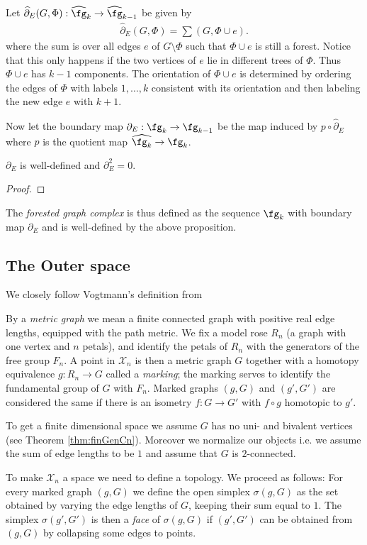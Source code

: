 \begin{definition}
	Let $\widehat{\partial}_E(G,\Phi): \widehat{\fg}_{k} \to \widehat{\fg}_{k-1}$ be given by
\begin{align*}
	\widehat{\partial}_{E}(G,\Phi) = \sum (G, \Phi \cup e)
.\end{align*}
where the sum is over all edges $e$ of $G \setminus \Phi$ such that $\Phi \cup e$ is still a forest.
Notice that this only happens if the two vertices of  $e$ lie in different trees of $\Phi$. Thus $\Phi \cup e$ has $k-1$ components.
The orientation of $\Phi \cup e$ is determined by ordering the edges of $\Phi$ with labels  $1,\ldots,k$ consistent with its orientation
and then labeling the new edge $e$ with  $k+1$.

Now let the boundary map $\partial_{E}: \fg_{k} \to \fg_{k-1}$ be the map induced by $p \circ \widehat{\partial}_{E}$ where $p$ is the quotient map $\widehat{\fg_{k}} \to \fg_{k}$.
\end{definition}

\begin{proposition}
	$\partial_{E}$ is well-defined and $\partial_{E}^2 = 0$.
\end{proposition}

\begin{proof}
	
\end{proof}

The \emph{forested graph complex} is thus defined as the sequence $\fg_{k}$ with boundary map $\partial_{E}$ and is well-defined by the above proposition.

\subsection{The Outer space}
We closely follow Vogtmann's definition from \cite[p. 2 ff.]{vogtmann16}
\begin{definition}
	By a \emph{metric graph} we mean a finite connected graph with positive real edge lengths, equipped with the path metric.
	We fix a model rose $R_{n}$ (a graph with one vertex and $n$ petals), and identify the petals of $R_{n}$ with the generators
	of the free group $F_{n}$. A point in $\mathcal{X}_{n}$ is then a metric graph $G$ together with a homotopy
	equivalence $g: R_{n} \to  G$ called a \emph{marking}; the marking serves to identify the fundamental group of $G$ with $F_{n}$.
	Marked graphs $(g,G)$ and $(g',G')$ are considered the same if there is an isometry  $f: G \to G'$ with $f \circ g$ homotopic to $g'$.

	To get a finite dimensional space we assume $G$ has no uni- and bivalent vertices (see Theorem \ref{thm:finGenCn}).
	Moreover we normalize our objects i.e. we assume the sum of edge lengths to be $1$ and assume that $G$ is $2$-connected.
\end{definition}
To make  $\mathcal{X}_{n}$ a space we need to define a topology. We proceed as follows: 
For every marked graph $(g,G)$ we define the open simplex $\sigma(g,G)$ as the set obtained by varying the edge lengths of $G$,
keeping their sum equal to $1$.
The simplex  $\sigma(g',G')$ is then a \emph{face} of $\sigma(g,G)$ if $(g',G')$ can be obtained from $(g,G)$ by collapsing some edges to points.

